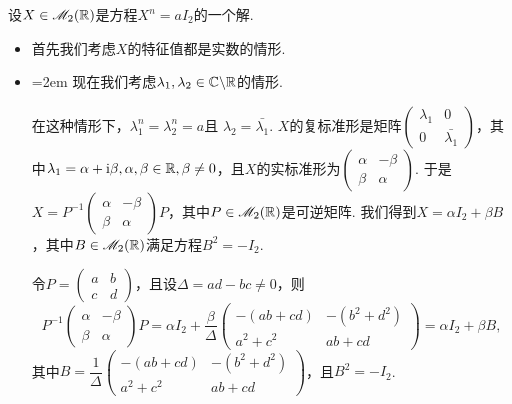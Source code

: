 设$X\in\mathscr M_2(\mathbb R)$是方程$X^n=aI_2$的一个解.
\begin{itemize}
  \item 首先我们考虑$X$的特征值都是实数的情形.
  \item\parindent=2em 现在我们考虑$\lambda_1,\lambda_2\in\mathbb C\backslash\mathbb R$的情形.

      在这种情形下，$\lambda_1^n=\lambda_2^n=a$且
      $\lambda_2=\bar{\lambda_1}$. $X$的复标准形是矩阵$\begin{pmatrix}
        \lambda_1 & 0 \\
        0 & \bar{\lambda_1}
      \end{pmatrix}$，其中$\lambda_1=\alpha+\mathrm i\beta,\alpha,\beta\in\mathbb R,\beta\ne0$，且$X$的实标准形为$\begin{pmatrix}
        \alpha & -\beta \\
        \beta & \alpha
      \end{pmatrix}$. 于是$X=P^{-1}\begin{pmatrix}
        \alpha & -\beta \\
        \beta & \alpha
      \end{pmatrix}P$，其中$P\in\mathscr M_2(\mathbb R)$是可逆矩阵. 我们得到$X=\alpha I_2+\beta B$，其中$B\in\mathscr M_2(\mathbb R)$满足方程$B^2=-I_2$.

      令$P=\begin{pmatrix}
        a & b \\
        c & d
      \end{pmatrix}$，且设$\varDelta=ad-bc\ne0$，则
      \[
        P^{-1}\begin{pmatrix}
        \alpha & -\beta \\
        \beta & \alpha
      \end{pmatrix} P = \alpha I_2 + \frac{\beta}{\varDelta} \begin{pmatrix}
        -(ab + cd) & - (b^2 + d^2) \\
        a^2 + c^2 & ab + cd
      \end{pmatrix} = \alpha I_2 + \beta B,
      \]
      其中$B=\dfrac1{\varDelta} \begin{pmatrix}
        -(ab + cd) & - (b^2 + d^2) \\
        a^2 + c^2 & ab + cd
      \end{pmatrix}$，且$B^2=-I_2$.


\end{itemize}
